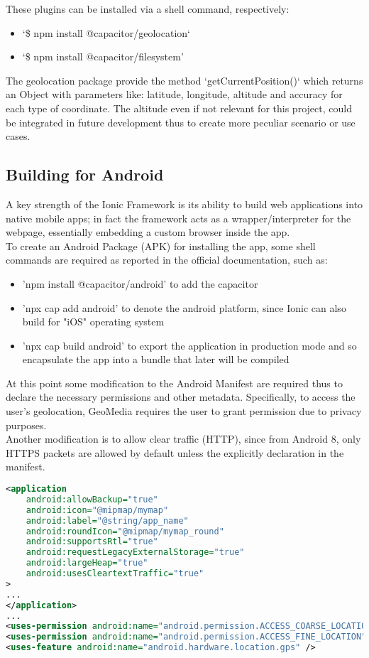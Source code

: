 \documentclass[conference]{IEEEtran}
\begin{document}
These plugins can be installed via a shell command, respectively:
\begin{itemize}
    \item `\$ npm install @capacitor/geolocation`
    \item `\$ npm install @capacitor/filesystem'
\end{itemize}

The geolocation package provide the method `getCurrentPosition()` which returns an Object with parameters like: latitude, longitude, altitude and accuracy for each type of coordinate. The altitude even if not relevant for this project, could be integrated in future development thus to create more peculiar scenario or use cases.


\subsection{Building for Android}

A key strength of the Ionic Framework is its ability to build web applications into native mobile apps; in fact the framework acts as a wrapper/interpreter for the webpage, essentially embedding a custom browser inside the app.
\\
To create an Android Package (APK) for installing the app, some shell commands are required as reported in the official documentation, such as:
\begin{itemize}
    \item 'npm install @capacitor/android' to add the capacitor
    \item  'npx cap add android' to denote the android platform, since Ionic can also build for "iOS" operating system
    \item 'npx cap build android' to export the application in production mode and so encapsulate the app into a bundle that later will be compiled
\end{itemize}


At this point some modification to the Android Manifest are required thus to declare the necessary permissions and other metadata.
Specifically, to access the user's geolocation, GeoMedia requires the user to grant permission due to privacy purposes.
\\
Another modification is to allow clear traffic (HTTP), since from Android 8, only HTTPS packets are allowed by default unless the explicitly declaration in the manifest.

\begin{lstlisting}[language=XML, caption=Snippet of Android Manifest]
<application
    android:allowBackup="true"
    android:icon="@mipmap/mymap"
    android:label="@string/app_name"
    android:roundIcon="@mipmap/mymap_round"
    android:supportsRtl="true"
    android:requestLegacyExternalStorage="true"
    android:largeHeap="true"
    android:usesCleartextTraffic="true"
>
...
</application>
...
<uses-permission android:name="android.permission.ACCESS_COARSE_LOCATION" />
<uses-permission android:name="android.permission.ACCESS_FINE_LOCATION" />
<uses-feature android:name="android.hardware.location.gps" />
        
\end{lstlisting}
\end{document}
